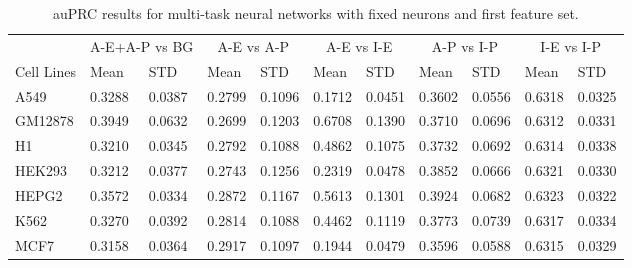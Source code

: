 \begin{table}[!htbp]
\centering
\caption{auPRC results for multi-task neural networks with fixed neurons and first feature set.}
\label{tab:fixed_neurons_auprc}
\hspace*{-2.2cm}
\begin{tabular}[t]{*{11}{l}}
\toprule
 & \multicolumn{2}{c}{A-E+A-P vs BG} & \multicolumn{2}{c}{A-E vs A-P} & \multicolumn{2}{c}{A-E vs I-E} & \multicolumn{2}{c}{A-P vs I-P} & \multicolumn{2}{c}{I-E vs I-P} \\
\cmidrule(lr){2-3}
\cmidrule(lr){4-5}
\cmidrule(lr){6-7}
\cmidrule(lr){8-9}
\cmidrule(lr){10-11}
Cell Lines & Mean & STD & Mean & STD & Mean & STD & Mean & STD & Mean & STD \\
\midrule
A549  & 0.3288 & 0.0387 & 0.2799 & 0.1096 & 0.1712 & 0.0451 & 0.3602 & 0.0556 & 0.6318 & 0.0325\\
GM12878  & 0.3949 & 0.0632 & 0.2699 & 0.1203 & 0.6708 & 0.1390 & 0.3710 & 0.0696 & 0.6312 & 0.0331\\
H1  & 0.3210 & 0.0345 & 0.2792 & 0.1088 & 0.4862 & 0.1075 & 0.3732 & 0.0692 & 0.6314 & 0.0338\\
HEK293  & 0.3212 & 0.0377 & 0.2743 & 0.1256 & 0.2319 & 0.0478 & 0.3852 & 0.0666 & 0.6321 & 0.0330\\
HEPG2  & 0.3572 & 0.0334 & 0.2872 & 0.1167 & 0.5613 & 0.1301 & 0.3924 & 0.0682 & 0.6323 & 0.0322\\
K562  & 0.3270 & 0.0392 & 0.2814 & 0.1088 & 0.4462 & 0.1119 & 0.3773 & 0.0739 & 0.6317 & 0.0334\\
MCF7  & 0.3158 & 0.0364 & 0.2917 & 0.1097 & 0.1944 & 0.0479 & 0.3596 & 0.0588 & 0.6315 & 0.0329\\
\bottomrule
\end{tabular}
\hspace*{-2.2cm}
\end{table}
%
